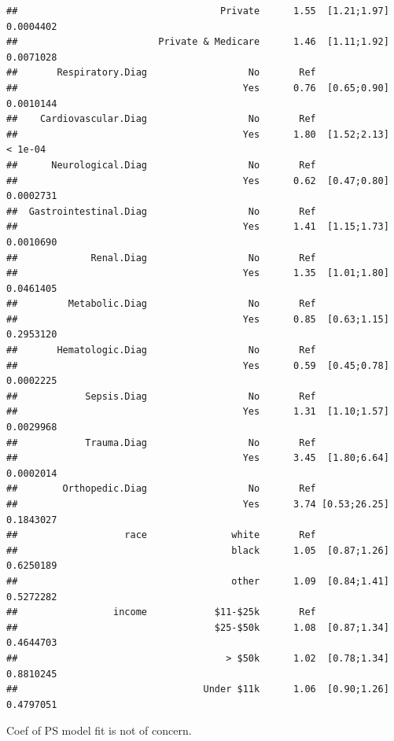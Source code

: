\documentclass[
]{book}
\begin{document}
\begin{verbatim}
##                                    Private      1.55  [1.21;1.97]   0.0004402 
##                         Private & Medicare      1.46  [1.11;1.92]   0.0071028 
##       Respiratory.Diag                  No       Ref                          
##                                        Yes      0.76  [0.65;0.90]   0.0010144 
##    Cardiovascular.Diag                  No       Ref                          
##                                        Yes      1.80  [1.52;2.13]     < 1e-04 
##      Neurological.Diag                  No       Ref                          
##                                        Yes      0.62  [0.47;0.80]   0.0002731 
##  Gastrointestinal.Diag                  No       Ref                          
##                                        Yes      1.41  [1.15;1.73]   0.0010690 
##             Renal.Diag                  No       Ref                          
##                                        Yes      1.35  [1.01;1.80]   0.0461405 
##         Metabolic.Diag                  No       Ref                          
##                                        Yes      0.85  [0.63;1.15]   0.2953120 
##       Hematologic.Diag                  No       Ref                          
##                                        Yes      0.59  [0.45;0.78]   0.0002225 
##            Sepsis.Diag                  No       Ref                          
##                                        Yes      1.31  [1.10;1.57]   0.0029968 
##            Trauma.Diag                  No       Ref                          
##                                        Yes      3.45  [1.80;6.64]   0.0002014 
##        Orthopedic.Diag                  No       Ref                          
##                                        Yes      3.74 [0.53;26.25]   0.1843027 
##                   race               white       Ref                          
##                                      black      1.05  [0.87;1.26]   0.6250189 
##                                      other      1.09  [0.84;1.41]   0.5272282 
##                 income            $11-$25k       Ref                          
##                                   $25-$50k      1.08  [0.87;1.34]   0.4644703 
##                                     > $50k      1.02  [0.78;1.34]   0.8810245 
##                                 Under $11k      1.06  [0.90;1.26]   0.4797051
\end{verbatim}

\begin{rmdcomment}
Coef of PS model fit is not of concern.
\end{rmdcomment}
\end{document}
